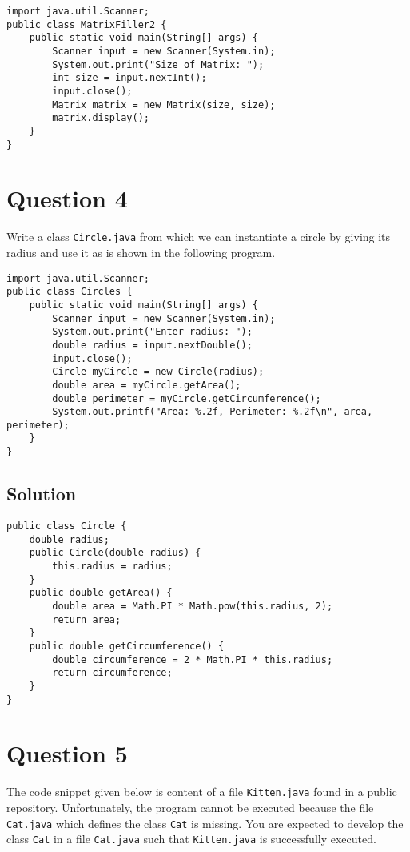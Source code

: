 \newpage

\lstset{language=Java,tabsize=4}
\begin{lstlisting}
import java.util.Scanner;
public class MatrixFiller2 {
	public static void main(String[] args) {
		Scanner input = new Scanner(System.in);
		System.out.print("Size of Matrix: ");
		int size = input.nextInt();
		input.close();
		Matrix matrix = new Matrix(size, size);
		matrix.display();
	}
}
\end{lstlisting}

\section*{Question 4}

Write a class \texttt{Circle.java} from which we can instantiate a circle by giving its radius and use it as is shown in the following program.

\lstset{caption=}
\lstset{language=Java,tabsize=4}
\begin{lstlisting}
import java.util.Scanner;
public class Circles {
	public static void main(String[] args) {
		Scanner input = new Scanner(System.in);
		System.out.print("Enter radius: ");
		double radius = input.nextDouble();
		input.close();
		Circle myCircle = new Circle(radius);
		double area = myCircle.getArea();
		double perimeter = myCircle.getCircumference();
		System.out.printf("Area: %.2f, Perimeter: %.2f\n", area, perimeter);
	}
}
\end{lstlisting}

\subsection*{Solution}

\lstset{language=Java,tabsize=4}
\begin{lstlisting}
public class Circle {
	double radius;
	public Circle(double radius) {
		this.radius = radius;
	}
	public double getArea() {
		double area = Math.PI * Math.pow(this.radius, 2);
		return area;
	}
	public double getCircumference() {
		double circumference = 2 * Math.PI * this.radius;
		return circumference;
	}
}
\end{lstlisting}

\section*{Question 5}
The code snippet given below is content of a file \texttt{Kitten.java} found in a public repository.
Unfortunately, the program cannot be executed because the file \texttt{Cat.java} which defines the class \texttt{Cat} is missing.
You are expected to develop the class \texttt{Cat} in a file \texttt{Cat.java} such that \texttt{Kitten.java} is successfully executed.

